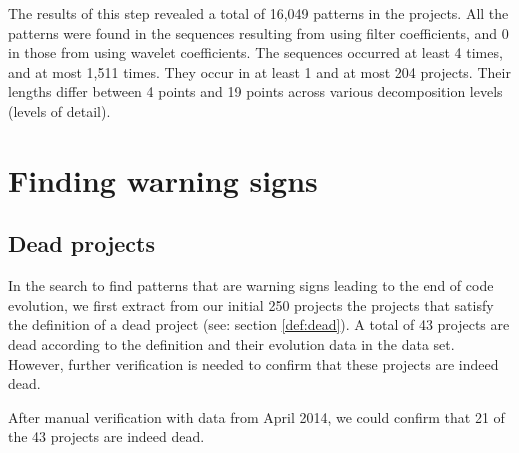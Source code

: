 The results of this step revealed a total of 16,049 patterns in the projects.
All the patterns were found in the sequences resulting from using filter
coefficients, and 0 in those from using wavelet coefficients. The sequences
occurred at least 4 times, and at most 1,511 times. They occur in at least 1
and at most 204 projects. Their lengths differ between 4 points and 19 points
across various decomposition levels (levels of detail).

\section{Finding warning signs}
\subsection{Dead projects}
In the search to find patterns that are warning signs leading to the end of code
evolution, we first extract from our initial 250 projects the projects that
satisfy the definition of a dead project (see: section \ref{def:dead}). A total
of 43 projects are dead according to the definition and their evolution data in
the data set. However, further verification is needed to confirm that these
projects are indeed dead.

After manual verification with data from April 2014, we could confirm that 21
of the 43 projects are indeed dead.

\begin{comment}
This chapter reports on the execution of the research method as described in Chapter 3.

If the research has been divided into phases (e.g., using sub questions) the
phases are introduced, reported on and concluded individually. If needed this
Chapter could be split up to balance out the sizes of all Chapters.
An example Research Chapter is provided as Chapter 3 at Paul’s home
page\footnote{http://homepages.cwi.nl/~paulk/thesesMasterSoftwareEngineering/2006/ReneWiegers.pdf}.
\end{comment}
